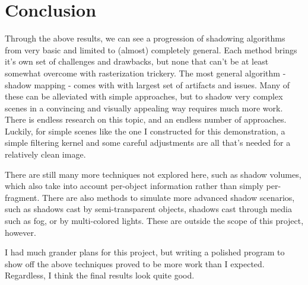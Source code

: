 \documentclass[acmsmall, screen, authorversion, nonacm]{acmart}
\begin{document}
\section{Conclusion}

Through the above results, we can see a progression of shadowing algorithms from very basic and limited to (almost) completely general. Each method brings it's own set of challenges and drawbacks, but none that can't be at least somewhat overcome with rasterization trickery. The most general algorithm - shadow mapping - comes with with largest set of artifacts and issues. Many of these can be alleviated with simple approaches, but to shadow very complex scenes in a convincing and visually appealing way requires much more work. There is endless research on this topic, and an endless number of approaches\cite{eisemann2011real}. Luckily, for simple scenes like the one I constructed for this demonstration, a simple filtering kernel and some careful adjustments are all that's needed for a relatively clean image.

There are still many more techniques not explored here, such as shadow volumes, which also take into account per-object information rather than simply per-fragment. There are also methods to simulate more advanced shadow scenarios, such as shadows cast by semi-transparent objects, shadows cast through media such as fog, or by multi-colored lights. These are outside the scope of this project, however.

I had much grander plans for this project, but writing a polished program to show off the above techniques proved to be more work than I expected. Regardless, I think the final results look quite good.




\end{document}
